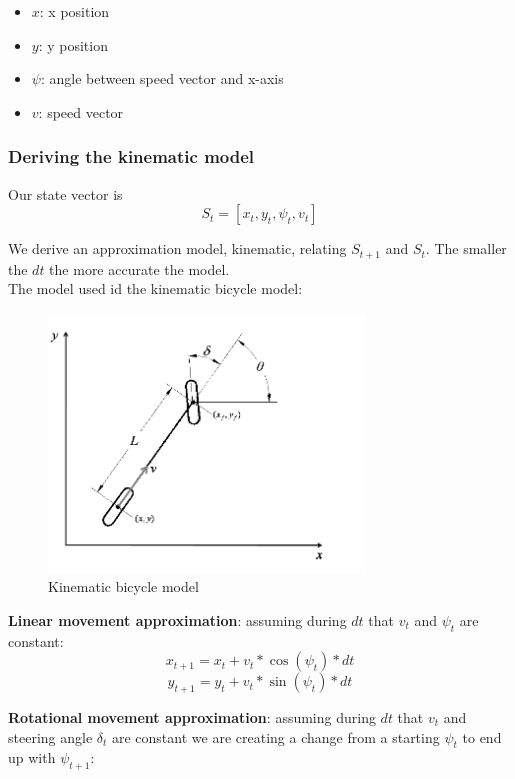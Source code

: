 \documentclass[11pt]{article}
\begin{document}
\begin{itemize}
\item $x$: x position
\item $y$: y position
\item $\psi$: angle between speed vector and x-axis
\item $v$: speed vector
\end{itemize}

\subsubsection{Deriving the kinematic model}


Our state vector is $$ S_t = [x_t, y_t, \psi_t, v_t] $$

We derive an approximation model, kinematic, relating $S_{t+1}$ and $S_t$. The smaller the $dt$ the more accurate the model. \\

The model used id the kinematic bicycle model:

\begin{figure}[h]
    \centering
    \includegraphics[width=0.75\textwidth]{bicycle_model}
    \caption{Kinematic bicycle model}
    \label{fig:bicycle_model}
\end{figure}
\FloatBarrier


\textbf{Linear movement approximation}: assuming during $dt$ that $v_t$ and $\psi_t$ are constant:
$$ x_{t+1} = x_t + v_t * \cos(\psi_t) *  dt $$
$$ y_{t+1} = y_t + v_t * \sin(\psi_t) *  dt $$

\textbf{Rotational movement approximation}: assuming during $dt$ that $v_t$ and steering angle $\delta_t$ are constant we are creating a change from a starting $\psi_t$ to end up with $\psi_{t+1}$: \\
\end{document}
